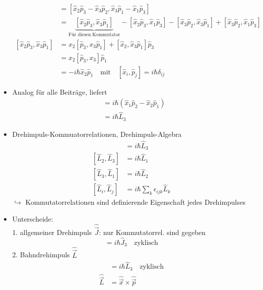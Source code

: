 \documentclass[10pt,article,colorback,accentcolor=tud9d]{scrartcl}
\begin{document}
\begin{itemize}
\begin{align}
      [\hat{L}_1,\hat{L}_2]&=[\hat{x}_2\hat{p}_3-\hat{x}_3\hat{p}_2,\hat{x}_3\hat{p}_1-\hat{x}_1\hat{p}_3]\\
      &=\underbrace{[\hat{x}_2\hat{p}_3,\hat{x}_3\hat{p}_1]}_{\text{Für diesen Kommutator}}-[\hat{x}_2\hat{p}_3,\hat{x}_1\hat{p}_3]-[\hat{x}_3\hat{p}_2,\hat{x}_3\hat{p}_1]+[\hat{x}_3\hat{p}_2,\hat{x}_1\hat{p}_3]\\
      [\hat{x}_2\hat{p}_3,\hat{x}_3\hat{p}_1]&=\hat{x}_2[\hat{p}_3,\hat{x}_3\hat{p}_1]+[\hat{x}_2,\hat{x}_3\hat{p}_1]\hat{p}_3\\
      &=\hat{x}_2[\hat{p}_3,\hat{x}_3]\hat{p}_1\\
      &=-i\hbar\hat{x}_2\hat{p}_1 \quad \text{mit}\quad [\hat{x}_i,\hat{p}_j]=i\hbar\delta_{ij}
    \end{align}
  \item Analog für alle Beiträge, liefert 
    \begin{align}
    [\hat{L}_1,\hat{L}_2]&=i\hbar(\hat{x}_1\hat{p}_2-\hat{x}_2\hat{p}_1)\\
    &=i\hbar\hat{L}_3
    \end{align}
  \item Drehimpuls-Kommuatorrelationen, Drehimpuls-Algebra
    \begin{align}
    [\hat{L}_1,\hat{L}_2]&=i\hbar\hat{L}_3\\
    [\hat{L}_2,\hat{L}_3]&=i\hbar\hat{L}_1\\
    [\hat{L}_3,\hat{L}_1]&=i\hbar\hat{L}_2\\
    [\hat{L}_i,\hat{L}_j]&= i\hbar\sum_k\epsilon_{ijk}\hat{L}_k
    \end{align}
    $\hookrightarrow$ Kommutatorrelationen sind definierende Eigenschaft jedes Drehimpulses
  \item Unterscheide:\\
    1. allgemeiner Drehimpuls $\hat{\vec{J}}$: nur Kommutatorrel. sind gegeben
    \begin{equation}
    [\hat{J}_1,\hat{J}_2]=i\hbar\hat{J}_3 \quad \text{zyklisch}
    \end{equation}
    2. Bahndrehimpuls $\hat{\vec{L}}$
    \begin{align}
    [\hat{L}_1,\hat{L}_2]&=i\hbar\hat{L}_3 \quad \text{zyklisch}\\
    \hat{\vec{L}}&=\hat{\vec{x}}\times\hat{\vec{p}}
    \end{align}
\end{itemize}
\end{document}
